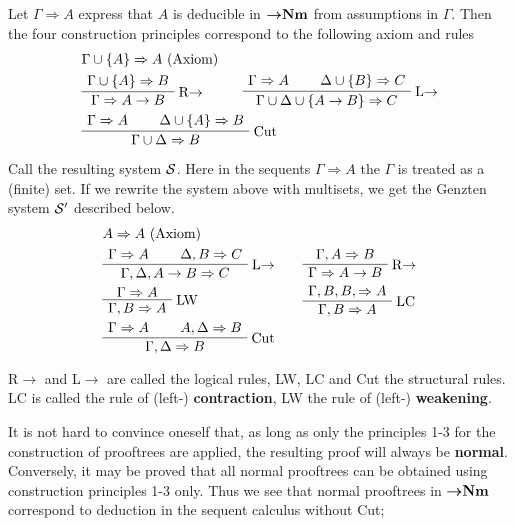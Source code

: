 \documentclass[11pt]{article}
\begin{document}
Let \(\Gamma\Rightarrow A\) express that \(A\) is deducible in \({\boldsymbol{\to}}\textbf{Nm}\) from
assumptions in \(\Gamma\). Then the four construction principles correspond to
the following axiom and rules
\begin{align*}
&\Gamma\cup\{A\}\Rightarrow A\text{ (Axiom)}\\
&
\AxiomC{$\Gamma\cup\{A\}\Rightarrow B$}
\RightLabel{R${\to}$}
\UnaryInfC{$\Gamma\Rightarrow A\to B$}
\DisplayProof
\hspace{1cm}
\AxiomC{$\Gamma\Rightarrow A$}
\AxiomC{$\Delta\cup\{B\}\Rightarrow C$}
\RightLabel{L${\to}$}
\BinaryInfC{$\Gamma\cup\Delta\cup\{A\to B\}\Rightarrow C$}
\DisplayProof
\\
&\AxiomC{$\Gamma\Rightarrow A$}
\AxiomC{$\Delta\cup\{A\}\Rightarrow B$}
\RightLabel{Cut}
\BinaryInfC{$\Gamma\cup\Delta\Rightarrow B$}
\DisplayProof
\end{align*}


Call the resulting system \(\mathcal{S}\). Here in the sequents \(\Gamma\Rightarrow
    A\) the \(\Gamma\) is treated as a (finite) set. If we rewrite the system above
with multisets, we get the Genzten system \(\mathcal{S}'\) described below.
\begin{alignat*}{2}
&A\Rightarrow A\text{ (Axiom)}&&\\
&\AxiomC{$\Gamma\Rightarrow A$}
\AxiomC{$\Delta,B\Rightarrow C$}
\RightLabel{L$\to$}
\BinaryInfC{$\Gamma,\Delta,A\to B\Rightarrow C$}
\DisplayProof
\quad
&&\AxiomC{$\Gamma,A\Rightarrow B$}
\RightLabel{R$\to$}
\UnaryInfC{$\Gamma\Rightarrow A\to B$}
\DisplayProof\\
&\AxiomC{$\Gamma\Rightarrow A$}
\RightLabel{LW}
\UnaryInfC{$\Gamma,B\Ra A$}
\DisplayProof
&&\AxiomC{$\Gamma,B,B,\Ra A$}
\RightLabel{LC}
\UnaryInfC{$\Gamma,B\Ra A$}
\DisplayProof\\
&\AxiomC{$\Gamma\Ra A$}
\AxiomC{$A,\Delta\Ra B$}
\RightLabel{Cut}
\BinaryInfC{$\Gamma,\Delta\Ra B$}
\DisplayProof
&&
\end{alignat*}



R\(\to\) and L\(\to\) are called the logical rules, LW, LC and Cut the
structural rules. 
LC is called the rule of (left-) \textbf{contraction}, LW the rule of
(left-) \textbf{weakening}. 


It is not hard to convince oneself that, as long as only the principles 1-3
for the construction of prooftrees are applied, the resulting proof will always
be \textbf{normal}. Conversely, it may be proved that all normal prooftrees can be
obtained using construction principles 1-3 only. Thus we see that normal
prooftrees in \({\boldsymbol{\to}}\textbf{Nm}\) correspond to deduction in the sequent calculus without
Cut; 
\end{document}
